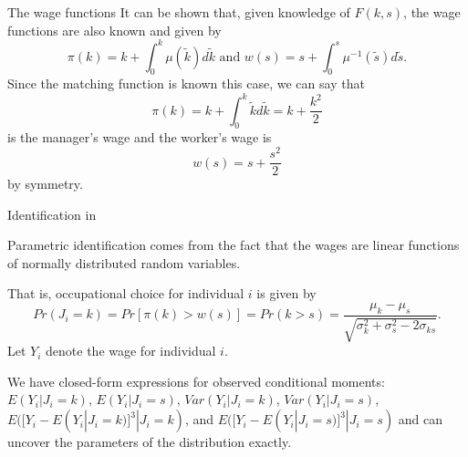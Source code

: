 \documentclass[aspectratio=169]{beamer}
\begin{document}
\begin{frame}{The wage functions}
	 It can be shown that, given knowledge of $F(k,s)$, the wage functions are also known and given by
	\begin{equation*}
		\pi(k) = k + \int_0^k\mu(\tilde{k})d\tilde{k} \text{ and } w(s) = s + \int_0^s\mu^{-1}(\tilde{s})d\tilde{s}.
	\end{equation*}
 	Since the matching function is known this case, we can say that
	\begin{equation*}
		\pi(k) = k + \int_0^k\tilde{k}d\tilde{k} = k +\frac{k^2}{2}
	\end{equation*}
	is the manager's wage and the worker's wage is 
	\begin{equation*}
		w(s) = s + \frac{s^2}{2}
	\end{equation*}
	by symmetry.
\end{frame}


\begin{frame}{Identification in \citet{heckman1990empirical}}
	
Parametric identification comes from the fact that the wages are linear functions of normally distributed random variables. 

\vspace{0.2cm}

That is, occupational choice for individual $i$ is given by
\begin{equation*}
Pr(J_i = k)=	Pr[\pi(k)>w(s)] = Pr(k>s) = \frac{\mu_k - \mu_s}{\sqrt{\sigma_k^2 + \sigma_s^2 - 2\sigma_{ks}}}.
\end{equation*}
Let $Y_i$ denote the wage for individual $i$. 

\vspace{0.5cm}

 We have closed-form expressions for observed conditional moments: $E(Y_i | J_i = k)$, $E(Y_i | J_i = s)$, $Var(Y_i | J_i = k)$, $Var(Y_i | J_i = s)$, $E([Y_i - E(Y_i|J_i = k)]^3|J_i = k)$, and $E([Y_i - E(Y_i|J_i = s)]^3|J_i = s)$ and can uncover the parameters of the distribution exactly.

\end{frame}
\end{document}
